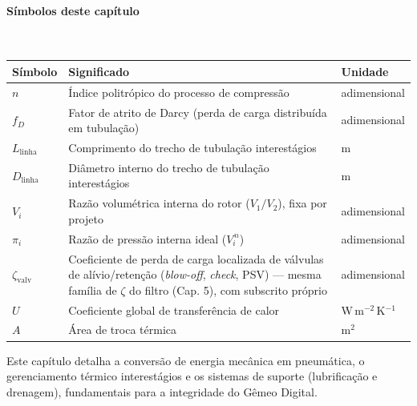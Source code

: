 \documentclass[12pt,a4paper]{article}
\numberwithin{equation}{section}
\numberwithin{table}{section}
\numberwithin{figure}{section}
\begin{document}
{\paragraph{Símbolos deste capítulo}\mbox{}\\[-0.5em]
{\small
\begin{longtable}{>{\raggedright\arraybackslash}p{2.6cm} >{\raggedright\arraybackslash}p{9.2cm} >{\raggedright\arraybackslash}p{2.6cm}}
	\toprule
	\textbf{Símbolo} & \textbf{Significado} & \textbf{Unidade} \\ \midrule
	\endhead
	$n$ & Índice politrópico do processo de compressão & adimensional \\
	$f_D$\dag & Fator de atrito de Darcy (perda de carga distribuída em tubulação) & adimensional \\
	$L_{\text{linha}}$ & Comprimento do trecho de tubulação interestágios & m \\
	$D_{\text{linha}}$ & Diâmetro interno do trecho de tubulação interestágios & m \\
	$V_i$ & Razão volumétrica interna do rotor ($V_1/V_2$), fixa por projeto & adimensional \\
	$\pi_i$ & Razão de pressão interna ideal ($V_i^{\,n}$) & adimensional \\
	$\zeta_{\text{valv}}$\dag & Coeficiente de perda de carga localizada de válvulas de alívio/retenção (\textit{blow-off}, \textit{check}, PSV) — mesma família de $\zeta$ do filtro (Cap. 5), com subscrito próprio & adimensional \\
	$U$ & Coeficiente global de transferência de calor & W\,m$^{-2}$\,K$^{-1}$ \\
	$A$ & Área de troca térmica & m$^2$ \\
	\bottomrule
\end{longtable}
}




	
	Este capítulo detalha a conversão de energia mecânica em pneumática, o gerenciamento térmico interestágios e os sistemas de suporte (lubrificação e drenagem), fundamentais para a integridade do Gêmeo Digital.
	
}
\end{document}
